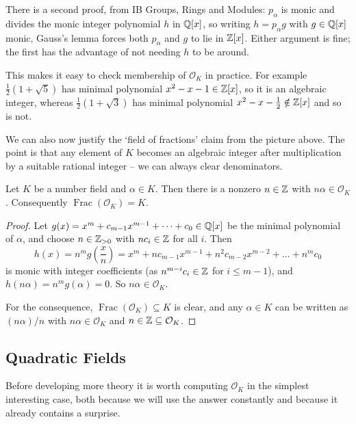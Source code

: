 \documentclass[a4paper]{scrartcl}
\renewcommand{\OO}{\mathcal{O}}
\newcommand{\Frac}{\operatorname{Frac}}
\begin{document}
\begin{remark}
	There is a second proof, from IB Groups, Rings and Modules: $p_\alpha$ is monic and divides the monic integer polynomial $h$ in $\mathbb{Q}[x]$, so writing $h = p_\alpha g$ with $g \in \mathbb{Q}[x]$ monic, Gauss's lemma forces both $p_\alpha$ and $g$ to lie in $\mathbb{Z}[x]$. Either argument is fine; the first has the advantage of not needing $h$ to be around.
\end{remark}

This makes it easy to check membership of $\OO_K$ in practice. For example $\tfrac{1}{2}(1 + \sqrt{5})$ has minimal polynomial $x^2 - x - 1 \in \mathbb{Z}[x]$, so it is an algebraic integer, whereas $\tfrac{1}{2}(1 + \sqrt{3})$ has minimal polynomial $x^2 - x - \tfrac12 \notin \mathbb{Z}[x]$ and so is not.

We can also now justify the `field of fractions' claim from the picture above. The point is that any element of $K$ becomes an algebraic integer after multiplication by a suitable rational integer -- we can always clear denominators.

\begin{lemma}\label{lem:clear}
	Let $K$ be a number field and $\alpha \in K$. Then there is a nonzero $n \in \mathbb{Z}$ with $n\alpha \in \OO_K$. Consequently $\Frac(\OO_K) = K$.
\end{lemma}

\begin{proof}
	Let $g(x) = x^m + c_{m-1}x^{m-1} + \dots + c_0 \in \mathbb{Q}[x]$ be the minimal polynomial of $\alpha$, and choose $n \in \mathbb{Z}_{>0}$ with $nc_i \in \mathbb{Z}$ for all $i$. Then
	$$h(x) = n^m g\!\left(\frac{x}{n}\right) = x^m + nc_{m-1}x^{m-1} + n^2c_{m-2}x^{m-2}+\dots+n^m c_0$$
	is monic with integer coefficients (as $n^{m-i}c_i \in \mathbb{Z}$ for $i \le m-1$), and $h(n\alpha) = n^mg(\alpha) = 0$. So $n\alpha \in \OO_K$.

	For the consequence, $\Frac(\OO_K) \subseteq K$ is clear, and any $\alpha \in K$ can be written as $(n\alpha)/n$ with $n\alpha \in \OO_K$ and $n \in \Z \subseteq \OO_K$.
\end{proof}

\subsection{Quadratic Fields}

Before developing more theory it is worth computing $\OO_K$ in the simplest interesting case, both because we will use the answer constantly and because it already contains a surprise.
\end{document}
